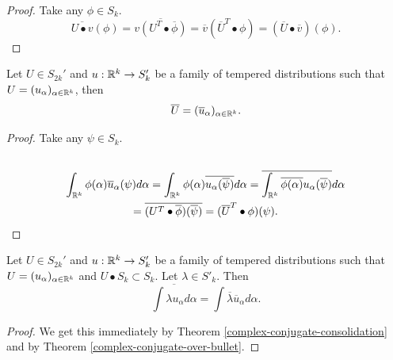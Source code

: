 \documentclass[main.tex]{subfiles}
\begin{document}
\begin{proof}
Take any $\phi\in S_k$.
\begin{equation}
\overline{U \bullet v}(\phi) = \overline{v(U^T \bullet \overline{\phi})} = \overline{v}(\overline{U}^T\bullet \phi) = (\overline{U} \bullet \overline{v})(\phi).
\end{equation}
\end{proof}
\begin{theorem}
\label{complex-conjugate-consolidation}
Let $U\in S_{2k}'$ and $u:\mathbb{R}^k\to S_k'$ be a family of tempered distributions such that $U = (u_\alpha)_{\alpha\in\mathbb{R}^k}$, then
\begin{equation}
\overline{U} = (\overline{u}_\alpha)_{\alpha\in\mathbb{R}^k}.
\end{equation}
\end{theorem}
\begin{proof}
Take any $\psi\in S_k$.
\begin{multline}
\\
\int_{\mathbb{R}^k} \phi(\alpha) \overline{u}_\alpha(\psi) d\alpha = \int_{\mathbb{R}^k} \phi(\alpha) \overline{u_\alpha(\overline{\psi})} d\alpha = \overline{\int_{\mathbb{R}^k} \overline{\phi(\alpha)} u_\alpha(\overline{\psi})} d\alpha \\
= \overline{(U^T \bullet \overline{\phi})(\overline{\psi})} = 
(\overline{U}^T\bullet \phi)(\psi).
\\  
\end{multline}
\end{proof}
\begin{theorem}
\label{distribution-integral-conjugate}
Let $U\in S_{2k}'$ and $u:\mathbb{R}^k\to S_k'$ be a family of tempered distributions such that $U = (u_\alpha)_{\alpha\in\mathbb{R}^k}$ and $U\bullet S_k \subset S_k$. Let $\lambda\in S'_k$. Then 
\begin{equation}
 \overline{\int \lambda u_\alpha d\alpha} = \int \overline{\lambda} \overline{u}_\alpha d\alpha. 
\end{equation}
\end{theorem}
\begin{proof}
We get this immediately by Theorem \ref{complex-conjugate-consolidation} and by Theorem \ref{complex-conjugate-over-bullet}.
\end{proof}
\end{document}
